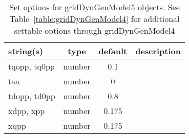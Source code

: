 \begin{table}[ht]
\centering
\begin{tabular}{p{5cm} c c p{7cm}}
\hline
string(s) & type & default & description \\
\hline
tqopp, tq0pp & number & 0.1 & \\
taa & number & 0 & \\
tdopp, td0pp & number & 0.8 & \\
xdpp, xpp & number & 0.175 & \\
xqpp & number & 0.175 & \\
\hline
\end{tabular}
\caption{Set options for gridDynGenModel5 objects. See Table~\ref{table:gridDynGenModel4} for additional settable options through gridDynGenModel4}
\label{table:gridDynGenModel5}
\end{table}
